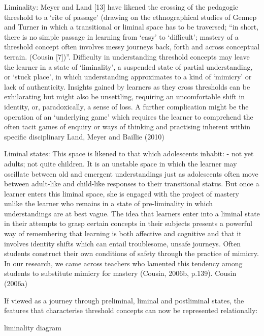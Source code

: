 \documentclass{tufte-book}\usepackage[]{graphicx}\usepackage[]{xcolor}
\begin{document}
Liminality: Meyer and Land [13] have likened the crossing of the pedagogic threshold to a ‘rite of passage’ (drawing on the ethnographical studies of Gennep and Turner in which a transitional or liminal space has to be traversed; “in short, there is no simple passage in learning from ‘easy’ to ‘difficult’; mastery of a threshold concept often involves messy journeys back, forth and across conceptual terrain. (Cousin [7])”. Difficulty in understanding threshold concepts may leave the learner in a state of ‘liminality’, a suspended state of partial understanding, or ‘stuck place’, in which understanding approximates to a kind of ‘mimicry’ or lack of authenticity. Insights gained by learners as they cross thresholds can be exhilarating but might also be unsettling, requiring an uncomfortable shift in identity, or, paradoxically, a sense of loss. A further complication might be the operation of an ‘underlying game’ which requires the learner to comprehend the often tacit games of enquiry or ways of thinking and practising inherent within specific disciplinary
                                                                                Land, Meyer and Baillie (2010)

Liminal states: This space is likened to that which adolescents inhabit: - not yet adults; not quite children. It is an unstable space in which the learner may oscillate between old and emergent understandings just as adolescents often move between adult-like and child-like responses to their transitional status. But once a learner enters this liminal space, she is engaged with the project of mastery unlike the learner who remains in a state of pre-liminality in which understandings are at best vague. The idea that learners enter into a liminal state in their attempts to grasp certain concepts in their subjects presents a powerful way of remembering that learning is both affective and cognitive and that it involves identity shifts which can entail troublesome, unsafe journeys. Often students construct their own conditions of safety through the practice of mimicry. In our research, we came across teachers who lamented this tendency among students to substitute mimicry for mastery (Cousin, 2006b, p.139).
                                                                                              Cousin (2006a)

If viewed as a journey through preliminal, liminal and postliminal states, the features that characterise threshold concepts can now be represented relationally:

 liminality diagram
\end{document}
